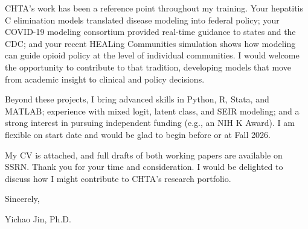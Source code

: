 \documentclass[11pt]{article}
\begin{document}
CHTA's work has been a reference point throughout my training. Your hepatitis C elimination models translated disease modeling into federal policy; your COVID-19 modeling consortium provided real-time guidance to states and the CDC; and your recent HEALing Communities simulation shows how modeling can guide opioid policy at the level of individual communities. I would welcome the opportunity to contribute to that tradition, developing models that move from academic insight to clinical and policy decisions.

Beyond these projects, I bring advanced skills in Python, R, Stata, and MATLAB; experience with mixed logit, latent class, and SEIR modeling; and a strong interest in pursuing independent funding (e.g., an NIH K Award). I am flexible on start date and would be glad to begin before or at Fall 2026.

My CV is attached, and full drafts of both working papers are available on SSRN. Thank you for your time and consideration. I would be delighted to discuss how I might contribute to CHTA's research portfolio.

\vspace{12pt}

Sincerely,

\vspace{1pt}

Yichao Jin, Ph.D.
\end{document}
